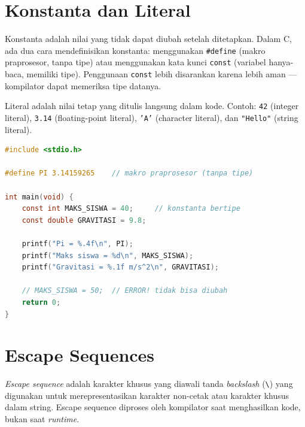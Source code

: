 \documentclass[../main.tex]{subfiles}
\begin{document}
\section{Konstanta dan Literal}

Konstanta adalah nilai yang tidak dapat diubah setelah ditetapkan. Dalam C, ada dua cara mendefinisikan konstanta: menggunakan \texttt{\#define} (makro praprosesor, tanpa tipe) atau menggunakan kata kunci \texttt{const} (variabel hanya-baca, memiliki tipe). Penggunaan \texttt{const} lebih disarankan karena lebih aman --- kompilator dapat memeriksa tipe datanya.

Literal adalah nilai tetap yang ditulis langsung dalam kode. Contoh: \texttt{42} (integer literal), \texttt{3.14} (floating-point literal), \texttt{'A'} (character literal), dan \texttt{"Hello"} (string literal).

\begin{lstlisting}[language=C,caption=Konstanta dan literal]
#include <stdio.h>

#define PI 3.14159265    // makro praprosesor (tanpa tipe)

int main(void) {
    const int MAKS_SISWA = 40;     // konstanta bertipe
    const double GRAVITASI = 9.8;
    
    printf("Pi = %.4f\n", PI);
    printf("Maks siswa = %d\n", MAKS_SISWA);
    printf("Gravitasi = %.1f m/s^2\n", GRAVITASI);
    
    // MAKS_SISWA = 50;  // ERROR! tidak bisa diubah
    return 0;
}
\end{lstlisting}

\section{Escape Sequences}

\textit{Escape sequence} adalah karakter khusus yang diawali tanda \textit{backslash} (\texttt{\textbackslash}) yang digunakan untuk merepresentasikan karakter non-cetak atau karakter khusus dalam string. Escape sequence diproses oleh kompilator saat menghasilkan kode, bukan saat \textit{runtime}.
\end{document}
